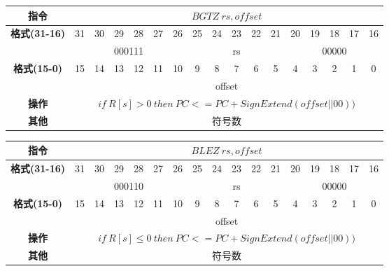 \documentclass[11pt,utf8]{article}
\begin{document}
\begin{center}
\begin{tabular}{|c|c|c|c|c|c|c|c|c|c|c|c|c|c|c|c|c|}
\hline
\textbf{指令} & \multicolumn{16}{c|}{$BGTZ~rs,offset$} \\
\hline
\multirow{2}{*}{\textbf{格式(31-16)}} & 31 & 30 & 29 & 28 & 27 & 26 & 25 & 24 & 23 & 22 & 21 & 20 & 19 & 18 & 17 & 16 \\ 
\cline{2-17}
& \multicolumn{6}{c|}{000111} & \multicolumn{5}{c|}{rs} & \multicolumn{5}{c|}{00000}\\
\hline
\multirow{2}{*}{\textbf{格式(15-0)}} & 15 & 14 & 13 & 12 & 11 & 10 & 9 & 8 & 7 & 6 & 5 & 4 & 3 & 2 & 1 & 0 \\
\cline{2-17}
& \multicolumn{16}{c|}{offset}\\
\hline
\textbf{操作} & \multicolumn{16}{c|}{$if~R[s] > 0~then~PC<= PC + SignExtend(offset||00))$} \\
\hline
\textbf{其他} & \multicolumn{16}{c|}{符号数} \\
\hline
\end{tabular}
\end{center}

\begin{center}
\begin{tabular}{|c|c|c|c|c|c|c|c|c|c|c|c|c|c|c|c|c|}
\hline
\textbf{指令} & \multicolumn{16}{c|}{$BLEZ~rs,offset$} \\
\hline
\multirow{2}{*}{\textbf{格式(31-16)}} & 31 & 30 & 29 & 28 & 27 & 26 & 25 & 24 & 23 & 22 & 21 & 20 & 19 & 18 & 17 & 16 \\ 
\cline{2-17}
& \multicolumn{6}{c|}{000110} & \multicolumn{5}{c|}{rs} & \multicolumn{5}{c|}{00000}\\
\hline
\multirow{2}{*}{\textbf{格式(15-0)}} & 15 & 14 & 13 & 12 & 11 & 10 & 9 & 8 & 7 & 6 & 5 & 4 & 3 & 2 & 1 & 0 \\
\cline{2-17}
& \multicolumn{16}{c|}{offset}\\
\hline
\textbf{操作} & \multicolumn{16}{c|}{$if~R[s] \le 0~then~PC<= PC + SignExtend(offset||00))$} \\
\hline
\textbf{其他} & \multicolumn{16}{c|}{符号数} \\
\hline
\end{tabular}
\end{center}
\end{document}
